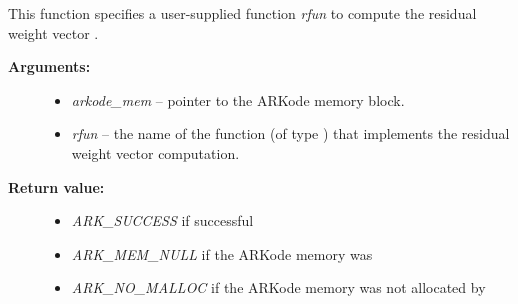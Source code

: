 \documentclass[letterpaper,10pt,english]{sphinxmanual}
\begin{document}
\begin{fulllineitems}
\label{c_interface/User_callable:ARKodeResFtolerance}
This function specifies a user-supplied function \emph{rfun} to compute
the residual weight vector .
\begin{description}
\item[{\textbf{Arguments:}}] \leavevmode\begin{itemize}
\item {} 
\emph{arkode\_mem} -- pointer to the ARKode memory block.

\item {} 
\emph{rfun} -- the name of the function (of type {\hyperref[c_interface/User_supplied:ARKRwtFn]{}})
that implements the residual weight vector computation.

\end{itemize}

\item[{\textbf{Return value:}}] \leavevmode\begin{itemize}
\item {} 
\emph{ARK\_SUCCESS} if successful

\item {} 
\emph{ARK\_MEM\_NULL}  if the ARKode memory was 

\item {} 
\emph{ARK\_NO\_MALLOC}  if the ARKode memory was not allocated by {\hyperref[c_interface/User_callable:ARKodeInit]{}}

\end{itemize}

\end{description}

\end{fulllineitems}
\end{document}
